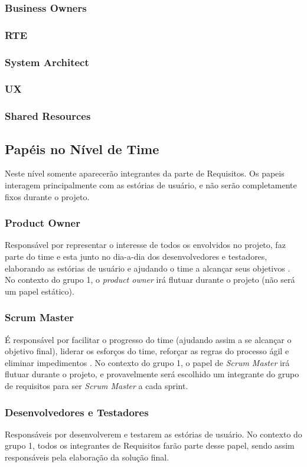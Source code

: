 \subsubsection{Business Owners}
\subsubsection{RTE}
\subsubsection{System Architect}
\subsubsection{UX}
\subsubsection{Shared Resources}

\subsection{Papéis no Nível de Time}
Neste nível somente aparecerão integrantes da parte de Requisitos. Os papeis interagem principalmente com as estórias de usuário, e não serão completamente fixos durante o projeto.

\subsubsection{Product Owner}
Responsável por representar o interesse de todos os envolvidos no projeto, faz parte do time e esta junto no dia-a-dia dos desenvolvedores e testadores, elaborando as estórias de usuário e ajudando o time a alcançar seus objetivos \cite{safe008}. No contexto do grupo 1, o \emph{product owner} irá flutuar durante o projeto (não será um papel estático).

\subsubsection{Scrum Master}
É responsável por facilitar o progresso do time (ajudando assim a se alcançar o objetivo final), liderar os esforços do time, reforçar as regras do processo ágil e eliminar impedimentos \cite{safe009}. No contexto do grupo 1, o papel de \emph{Scrum Master} irá flutuar durante o projeto, e provavelmente será escolhido um integrante do grupo de requisitos para ser \emph{Scrum Master} a cada sprint.

\subsubsection{Desenvolvedores e Testadores}
Responsáveis por desenvolverem e testarem as estórias de usuário. No contexto do grupo 1, todos os integrantes de Requisitos farão parte desse papel, sendo assim responsáveis pela elaboração da solução final.